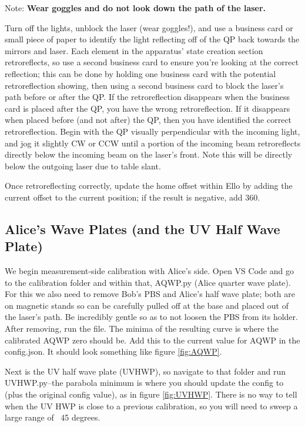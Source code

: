 \documentclass{paper}[11pt]
\begin{document}
Note: \textbf{Wear goggles and do not look down the path of the laser.}

Turn off the lights, unblock the laser (wear goggles!), and use a business card or small piece of paper to identify the light reflecting off of the QP back towards the mirrors and laser. Each element in the apparatus' state creation section retroreflects, so use a second business card to ensure you're looking at the correct reflection; this can be done by holding one business card with the potential retroreflection showing, then using a second business card to block the laser's path before or after the QP. If the retroreflection disappears when the business card is placed after the QP, you have the wrong retroreflection. If it disappears when placed before (and not after) the QP, then you have identified the correct retroreflection. Begin with the QP visually perpendicular with the incoming light, and jog it slightly CW or CCW until a portion of the incoming beam retroreflects directly below the incoming beam on the laser's front. Note this will be directly below the outgoing laser due to table slant.

Once retroreflecting correctly, update the home offset within Ello by adding the current offset to the current position; if the result is negative, add 360. 

\subsection{Alice's Wave Plates (and the UV Half Wave Plate)}
We begin measurement-side calibration with Alice's side. Open VS Code and go to the calibration folder and within that, AQWP.py (Alice quarter wave plate). For this we also need to remove Bob's PBS and Alice's half wave plate; both are on magnetic stands so can be carefully pulled off at the base and placed out of the laser's path. Be incredibly gentle so as to not loosen the PBS from its holder. After removing, run the file. The minima of the resulting curve is where the calibrated AQWP zero should be. Add this to the current value for AQWP in the config.json. It should look something like figure \ref{fig:AQWP}.

Next is the UV half wave plate (UVHWP), so navigate to that folder and run UVHWP.py--the parabola minimum is where you should update the config to (plus the original config value), as in figure \ref{fig:UVHWP}. There is no way to tell when the UV HWP is close to a previous calibration, so you will need to sweep a large range of ~45 degrees. 
\end{document}
